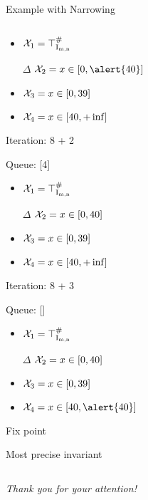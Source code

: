 \documentclass{beamer}
\newcommand{\Intmn}{\textrm{I}_{\textrm{m,n}}}
\begin{document}
\begin{frame}{Example with Narrowing}
\begin{columns}[T]
\begin{column}{0.5\textwidth}
\begin{overprint}
                \begin{itemize}
                    \item ${\cal{X}}_1 = \top^\#_{\Intmn}$
                    \item[$\Delta$] ${\cal{X}}_2 = x \in [0, \alert{40}]$
                    \item ${\cal{X}}_3 = x \in [0, 39]$
                    \item ${\cal{X}}_4 = x \in [40, +\inf]$
                \end{itemize}

                Iteration: 8 + 2

                Queue: [4]

                \begin{itemize}
                    \item ${\cal{X}}_1 = \top^\#_{\Intmn}$
                    \item[$\Delta$] ${\cal{X}}_2 = x \in [0, 40]$
                    \item ${\cal{X}}_3 = x \in [0, 39]$
                    \item ${\cal{X}}_4 = x \in [40, +\inf]$
                \end{itemize}

                Iteration: 8 + 3

                Queue: []

                \begin{itemize}
                    \item ${\cal{X}}_1 = \top^\#_{\Intmn}$
                    \item[$\Delta$] ${\cal{X}}_2 = x \in [0, 40]$
                    \item ${\cal{X}}_3 = x \in [0, 39]$
                    \item ${\cal{X}}_4 = x \in [40, \alert{40}]$
                \end{itemize}
                Fix point

                Most precise invariant


            \end{overprint}

        \end{column}
    \end{columns}

\end{frame}

\begin{frame}
    \centering \huge
    \emph{Thank you for your attention!}
\end{frame}
\end{document}
